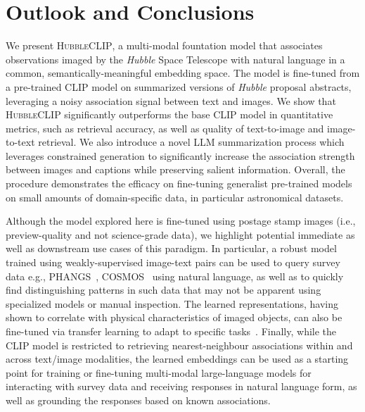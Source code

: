 \documentclass[10pt]{article} %
\newcommand{\hubble}{\emph{Hubble}\xspace}
\begin{document}
\section{Outlook and Conclusions}
\label{sec:conclusion}

We present \textsc{HubbleCLIP}, a multi-modal fountation model that associates observations imaged by the \hubble Space Telescope with natural language in a common, semantically-meaningful embedding space. The model is fine-tuned from a pre-trained CLIP model on summarized versions of \hubble proposal abstracts, leveraging a noisy association signal between text and images. We show that \textsc{HubbleCLIP} significantly outperforms the base CLIP model in quantitative metrics, such as retrieval accuracy, as well as quality of text-to-image and image-to-text retrieval. We also introduce a novel LLM summarization process which leverages constrained generation to significantly increase the association strength between images and captions while preserving salient information. Overall, the procedure demonstrates the efficacy on fine-tuning generalist pre-trained models on small amounts of domain-specific data, in particular astronomical datasets.

Although the model explored here is fine-tuned using postage stamp images (i.e., preview-quality and not science-grade data), we highlight potential immediate as well as downstream use cases of this paradigm. In particular, a robust model trained using weakly-supervised image-text pairs can be used to query survey data e.g., PHANGS~\citep{lee2022phangs}, COSMOS~\citep{scoville2007cosmic} using natural language, as well as to quickly find distinguishing patterns in such data that may not be apparent using specialized models or manual inspection. The learned representations, having shown to correlate with physical characteristics of imaged objects, can also be fine-tuned via transfer learning to adapt to specific tasks~\citep[e.g., classification as in][]{wei2020deep}. Finally, while the CLIP model is restricted to retrieving nearest-neighbour associations within and across text/image modalities, the learned embeddings can be used as a starting point for training or fine-tuning multi-modal large-language models for interacting with survey data and receiving responses in natural language form, as well as grounding the responses based on known associations.

\end{document}
